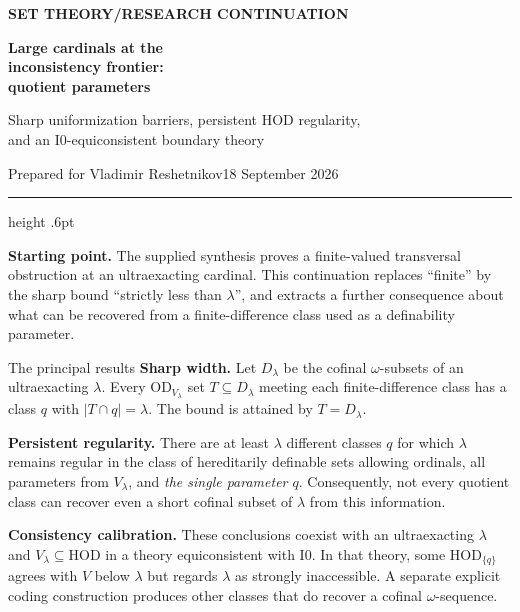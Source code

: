 \documentclass[11pt,letterpaper]{article}
\theoremstyle{definition}
\numberwithin{equation}{section}
\newcommand{\HOD}{\mathrm{HOD}}
\newcommand{\OD}{\mathrm{OD}}
\newcommand{\Izero}{\mathrm{I0}}
\begin{document}
\thispagestyle{empty}
{\sffamily\bfseries\small\color{Olive}SET THEORY\quad /\quad RESEARCH CONTINUATION}

\vspace{13pt}
{\fontsize{28}{31}\selectfont\bfseries\color{Forest}Large cardinals at the\\ inconsistency frontier:\\ quotient parameters\par}
\vspace{10pt}
{\fontsize{14}{18}\selectfont Sharp uniformization barriers, persistent HOD regularity,\\ and an $\Izero$-equiconsistent boundary theory\par}
\vspace{14pt}
{\color{Muted}Prepared for Vladimir Reshetnikov\hfill 18 September 2026\par}
\vspace{3pt}
{\color{Sage}\hrule height .6pt}
\vspace{12pt}

\textbf{Starting point.} The supplied synthesis proves a finite-valued transversal obstruction at an ultraexacting cardinal. This continuation replaces ``finite'' by the sharp bound ``strictly less than $\lambda$'', and extracts a further consequence about what can be recovered from a finite-difference class used as a definability parameter.

\begin{assessment}{The principal results}
\textbf{Sharp width.} Let $D_\lambda$ be the cofinal $\omega$-subsets of an ultraexacting $\lambda$. Every $\OD_{V_\lambda}$ set $T\subseteq D_\lambda$ meeting each finite-difference class has a class $q$ with $|T\cap q|=\lambda$. The bound is attained by $T=D_\lambda$.

\textbf{Persistent regularity.} There are at least $\lambda$ different classes $q$ for which $\lambda$ remains regular in the class of hereditarily definable sets allowing ordinals, all parameters from $V_\lambda$, and \emph{the single parameter $q$}. Consequently, not every quotient class can recover even a short cofinal subset of $\lambda$ from this information.

\textbf{Consistency calibration.} These conclusions coexist with an ultraexacting $\lambda$ and $V_\lambda\subseteq\HOD$ in a theory equiconsistent with $\Izero$. In that theory, some $\HOD_{\{q\}}$ agrees with $V$ below $\lambda$ but regards $\lambda$ as strongly inaccessible. A separate explicit coding construction produces other classes that do recover a cofinal $\omega$-sequence.
\end{assessment}
\end{document}
